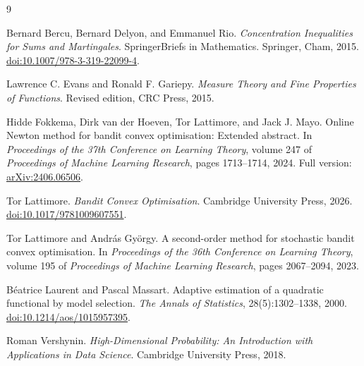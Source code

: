 \documentclass{article}
\newcommand{\1}{\mathbf 1}
\begin{document}
\newpage
\begin{thebibliography}{9}
    \raggedright

    Bernard Bercu, Bernard Delyon, and Emmanuel Rio.
    \newblock \emph{Concentration Inequalities for Sums and Martingales}.
    \newblock SpringerBriefs in Mathematics. Springer, Cham, 2015.
    \newblock \href{https://doi.org/10.1007/978-3-319-22099-4}
    {doi:10.1007/978-3-319-22099-4}.

    Lawrence C. Evans and Ronald F. Gariepy.
    \newblock \emph{Measure Theory and Fine Properties of Functions}.
    \newblock Revised edition, CRC Press, 2015.

    Hidde Fokkema, Dirk van der Hoeven, Tor Lattimore, and Jack J. Mayo.
    \newblock Online Newton method for bandit convex optimisation: Extended abstract.
    \newblock In \emph{Proceedings of the 37th Conference on Learning Theory},
    volume 247 of \emph{Proceedings of Machine Learning Research}, pages
    1713--1714, 2024.
    \newblock Full version: \href{https://arxiv.org/abs/2406.06506}{arXiv:2406.06506}.

    Tor Lattimore.
    \newblock \emph{Bandit Convex Optimisation}.
    \newblock Cambridge University Press, 2026.
    \newblock \href{https://doi.org/10.1017/9781009607551}{doi:10.1017/9781009607551}.

    Tor Lattimore and Andr\'as Gy\"orgy.
    \newblock A second-order method for stochastic bandit convex optimisation.
    \newblock In \emph{Proceedings of the 36th Conference on Learning Theory},
    volume 195 of \emph{Proceedings of Machine Learning Research}, pages
    2067--2094, 2023.

    B\'eatrice Laurent and Pascal Massart.
    \newblock Adaptive estimation of a quadratic functional by model selection.
    \newblock \emph{The Annals of Statistics}, 28(5):1302--1338, 2000.
    \newblock \href{https://doi.org/10.1214/aos/1015957395}
    {doi:10.1214/aos/1015957395}.

    Roman Vershynin.
    \newblock \emph{High-Dimensional Probability: An Introduction with
        Applications in Data Science}.
    \newblock Cambridge University Press, 2018.


\end{thebibliography}
\end{document}
